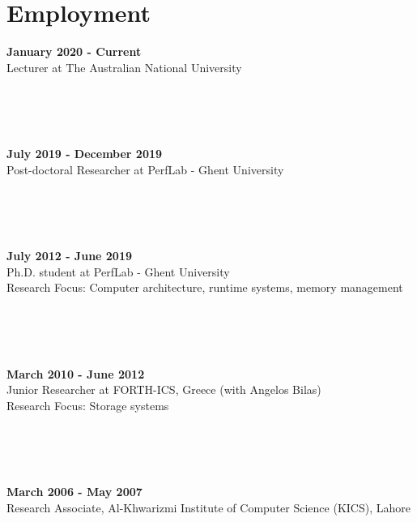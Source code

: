 \documentclass[singlecolumn,singlespace,11pt]{article}
\begin{document}
\section*{Employment}
\begin{minipage}{\linewidth}
\noindent \textbf{January 2020 - Current}\\
Lecturer at The Australian National University \\
\end{minipage}
\\
\\
\\
\begin{minipage}{\linewidth}
\noindent \textbf{July 2019 - December 2019}\\
Post-doctoral Researcher at PerfLab - Ghent University \\
\end{minipage}
\\
\\
\\
\begin{minipage}{\linewidth}
\noindent \textbf{July 2012 - June 2019}\\
Ph.D. student at PerfLab - Ghent University \\
Research Focus: Computer architecture, runtime systems, memory management
\end{minipage}
\\
\\
\\
\begin{minipage}{\linewidth}
\noindent \textbf{March 2010 - June 2012}\\
Junior Researcher at FORTH-ICS, Greece (with Angelos Bilas) \\
Research Focus: Storage systems
\end{minipage}
\\
\\
\\
\begin{minipage}{\linewidth}
\noindent \textbf{March 2006 - May 2007}\\
Research Associate, Al-Khwarizmi Institute of Computer Science (KICS), Lahore\\
\end{minipage}
\end{document}
